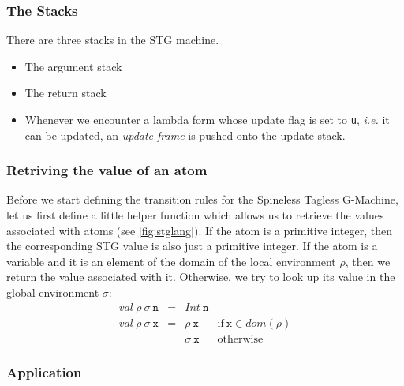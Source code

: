 \subsubsection{The Stacks}

There are three stacks in the STG machine.

\begin{itemize}
\item The argument stack 
\item The return stack
\item Whenever we encounter a lambda form whose update flag is set to \texttt{u}, \emph{i.e.} it can be updated, an \emph{update frame} is pushed onto the update stack. 
\end{itemize}

\subsubsection{Retriving the value of an atom}

Before we start defining the transition rules for the Spineless Tagless G-Machine, let us first define a little helper function which allows us to retrieve the values associated with atoms (see \autoref{fig:stglang}). If the atom is a primitive integer, then the corresponding STG value is also just a primitive integer. If the atom is a variable and it is an element of the domain of the local environment $\rho$, then we return the value associated with it. Otherwise, we try to look up its value in the global environment $\sigma$:
\begin{displaymath}
\begin{array}{lcll}
\mathit{val}~\rho~\sigma~\texttt{n} & = & \mathit{Int}~\texttt{n} & \\
\mathit{val}~\rho~\sigma~\texttt{x} & = & \rho~\texttt{x}   & \text{if}~\texttt{x} \in \mathit{dom}(\rho) \\
                                    &   & \sigma~\texttt{x} & \text{otherwise}
\end{array}
\end{displaymath}

\subsubsection{Application}

